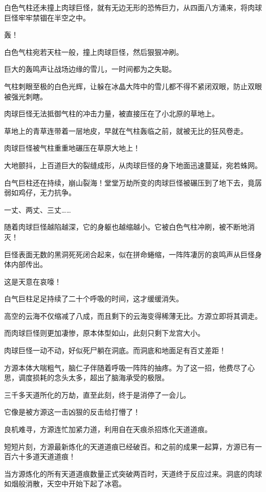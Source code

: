 \begin{this_body}
白色气柱还未撞上肉球巨怪，就有无边无形的恐怖巨力，从四面八方涌来，将肉球巨怪牢牢禁锢在半空之中。

轰！

白色气柱宛若天柱一般，撞上肉球巨怪，然后狠狠冲刷。

巨大的轰鸣声让战场边缘的雪儿，一时间都为之失聪。

气柱刺眼至极的白色光辉，让躲在冰晶大阵中的雪儿都不得不紧闭双眼，防止双眼被强光刺瞎。

肉球巨怪无法抵御气柱的冲击力量，被直接压在了小北原的草地上。

草地上的青草连带着一层地皮，早就在气柱轰临之前，就被无比的狂风卷走。

肉球巨怪被气柱重重地碾压在草原大地上！

大地颤抖，上百道巨大的裂缝成形，从肉球巨怪的身下地面迅速蔓延，宛若蛛网。

白气巨柱还在持续，崩山裂海！堂堂万劫所变的肉球巨怪被碾压到了地下去，竟孱弱如鸡仔，无力抗争。

一丈、两丈、三丈……

随着肉球巨怪越陷越深，它的身躯也越缩越小。它被白色气柱冲刷，被不断地消灭！

巨怪表面无数的黑洞死死闭合起来，似在拼命蜷缩，一阵阵凄厉的哀鸣声从巨怪身体内部传出。

这是天意在哀嚎！

白气巨柱足足持续了二十个呼吸的时间，这才缓缓消失。

高空的云海不仅缩减了八成，而且剩下的云海变得稀薄无比。方源立即将其调走。

而肉球巨怪则更加凄惨，原本体型如山，此刻只剩下龙宫大小。

肉球巨怪一动不动，好似死尸躺在洞底。而洞底和地面足有百丈差距！

方源本体大喘粗气，脑仁子伴随着呼吸一阵阵的抽疼。为了这一招，他费尽了心思，调度损耗的念头太多，超出了脑海承受的极限。

三千多天道所化的万劫，直至此刻，终于是消停了一会儿。

它像是被方源这一击凶狠的反击给打懵了！

良机难寻，方源连忙加紧力道，利用自在天痕杀招炼化天道道痕。

短短片刻，方源最新炼化的天道道痕已经破百。和之前的成果一起算，方源已有一百六十多道天道道痕！

当方源炼化的所有天道道痕数量正式突破两百时，天道终于反应过来。洞底的肉球如烟般消散，天空中开始下起了冰雹。


\end{this_body}
